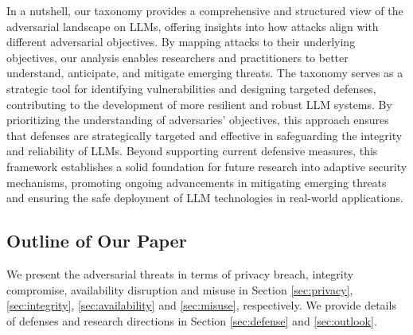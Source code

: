 In a nutshell, our taxonomy provides a comprehensive and structured view of the adversarial landscape on LLMs, offering insights into how attacks align with different adversarial objectives. By mapping attacks to their underlying objectives, our analysis enables researchers and practitioners to better understand, anticipate, and mitigate emerging threats. The taxonomy serves as a strategic tool for identifying vulnerabilities and designing targeted defenses, contributing to the development of more resilient and robust LLM systems.  By prioritizing the understanding of adversaries' objectives, this approach ensures that defenses are strategically targeted and effective in safeguarding the integrity and reliability of LLMs. Beyond supporting current defensive measures, this framework establishes a solid foundation for future research into adaptive security mechanisms, promoting ongoing advancements in mitigating emerging threats and ensuring the safe deployment of LLM technologies in real-world applications.

\subsection{Outline of Our Paper}

We present the adversarial threats in terms of privacy breach, integrity compromise, availability disruption and misuse in Section \ref{sec:privacy}, \ref{sec:integrity}, \ref{sec:availability} and \ref{sec:misuse}, respectively. We provide details of defenses and research directions in Section \ref{sec:defense} and \ref{sec:outlook}.


